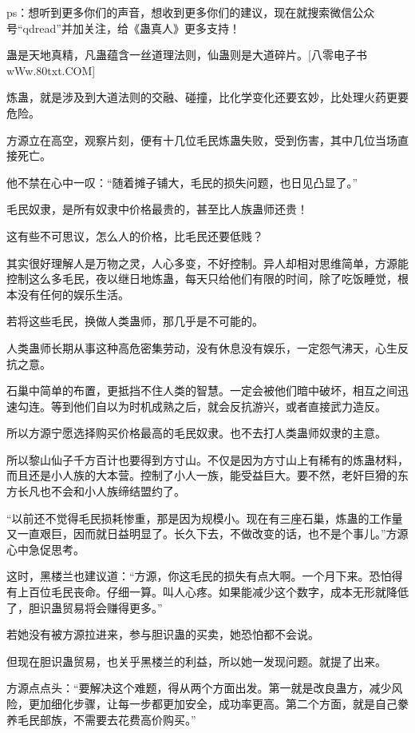 
\begin{this_body}

ps：想听到更多你们的声音，想收到更多你们的建议，现在就搜索微信公众号“qdread”并加关注，给《蛊真人》更多支持！

蛊是天地真精，凡蛊蕴含一丝道理法则，仙蛊则是大道碎片。[八零电子书wWw.80txt.COM]

炼蛊，就是涉及到大道法则的交融、碰撞，比化学变化还要玄妙，比处理火药更要危险。

方源立在高空，观察片刻，便有十几位毛民炼蛊失败，受到伤害，其中几位当场直接死亡。

他不禁在心中一叹：“随着摊子铺大，毛民的损失问题，也日见凸显了。”

毛民奴隶，是所有奴隶中价格最贵的，甚至比人族蛊师还贵！

这有些不可思议，怎么人的价格，比毛民还要低贱？

其实很好理解人是万物之灵，人心多变，不好控制。异人却相对思维简单，方源能控制这么多毛民，夜以继日地炼蛊，每天只给他们有限的时间，除了吃饭睡觉，根本没有任何的娱乐生活。

若将这些毛民，换做人类蛊师，那几乎是不可能的。

人类蛊师长期从事这种高危密集劳动，没有休息没有娱乐，一定怨气沸天，心生反抗之意。

石巢中简单的布置，更抵挡不住人类的智慧。一定会被他们暗中破坏，相互之间迅速勾连。等到他们自以为时机成熟之后，就会反抗游兴，或者直接武力造反。

所以方源宁愿选择购买价格最高的毛民奴隶。也不去打人类蛊师奴隶的主意。

所以黎山仙子千方百计也要得到方寸山。不仅是因为方寸山上有稀有的炼蛊材料，而且还是小人族的大本营。控制了小人一族，能受益巨大。要不然，老奸巨猾的东方长凡也不会和小人族缔结盟约了。

“以前还不觉得毛民损耗惨重，那是因为规模小。现在有三座石巢，炼蛊的工作量又一直艰巨，因而就日益明显了。长久下去，不做改变的话，也不是个事儿。”方源心中急促思考。

这时，黑楼兰也建议道：“方源，你这毛民的损失有点大啊。一个月下来。恐怕得有上百位毛民丧命。仔细一算。叫人心疼。如果能减少这个数字，成本无形就降低了，胆识蛊贸易将会赚得更多。”

若她没有被方源拉进来，参与胆识蛊的买卖，她恐怕都不会说。

但现在胆识蛊贸易，也关乎黑楼兰的利益，所以她一发现问题。就提了出来。

方源点点头：“要解决这个难题，得从两个方面出发。第一就是改良蛊方，减少风险，更加细化步骤，让每一步都更加安全，成功率更高。第二个方面，就是自己豢养毛民部族，不需要去花费高价购买。”


\end{this_body}
